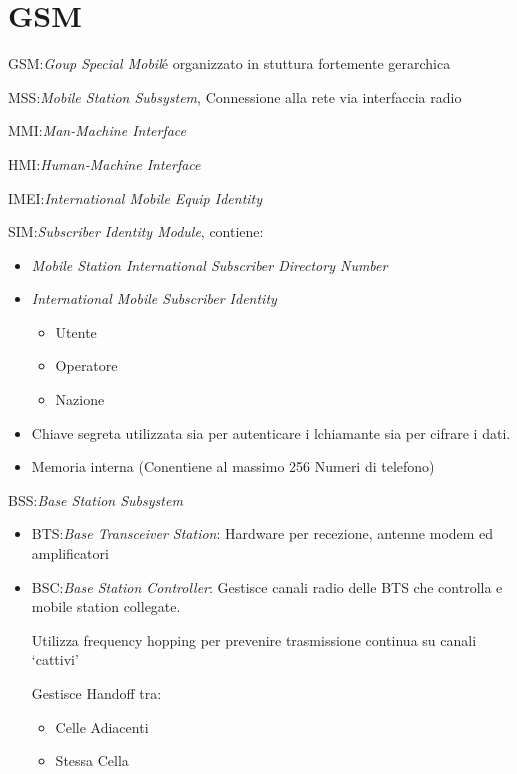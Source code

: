\documentclass{article}
\begin{document}
\section{GSM}
GSM:\@\textit{Goup Special Mobil}\'e organizzato in stuttura fortemente gerarchica

MSS:\@\textit{Mobile Station Subsystem}, Connessione alla rete via interfaccia radio

MMI:\@\textit{Man-Machine Interface}

HMI:\@\textit{Human-Machine Interface}

IMEI:\@\textit{International Mobile Equip Identity}

SIM:\@\textit{Subscriber Identity Module}, contiene:
\begin{itemize}
    \item \textit{Mobile Station International Subscriber Directory Number}
    \item \textit{International Mobile Subscriber Identity}
        \begin{itemize}
            \item Utente
            \item Operatore
            \item Nazione
        \end{itemize}
    \item Chiave segreta utilizzata sia per autenticare i lchiamante sia per cifrare i dati.
    \item Memoria interna (Conentiene al massimo 256 Numeri di telefono)
\end{itemize}

BSS:\@\textit{Base Station Subsystem}

\begin{itemize}
    \item BTS:\@\textit{Base Transceiver Station}: Hardware per recezione, antenne modem ed amplificatori
    \item BSC:\@\textit{Base Station Controller}: Gestisce canali radio delle BTS che controlla e mobile station collegate.

        Utilizza frequency hopping per prevenire trasmissione continua su canali `cattivi'

        Gestisce Handoff tra:
        \begin{itemize}
            \item Celle Adiacenti
            \item Stessa Cella
        \end{itemize}
\end{itemize}
\end{document}

